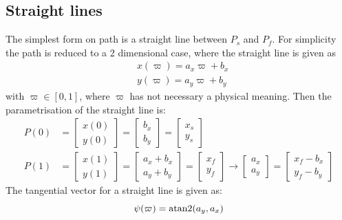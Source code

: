 \subsection{Straight lines}
The simplest form on path is a straight line between $P_s$ and $P_f$. For simplicity the path is reduced to a 2 dimensional case, where the straight line is given as 
\begin{subequations}
\begin{align}
& x(\varpi) = a_x\varpi + b_x \\
& y(\varpi) = a_y\varpi + b_y 
\end{align}
\end{subequations}
with $ \varpi \in [0,1] $, where $\varpi$ has not necessary a physical meaning. Then the parametrisation of the straight line is:
\begin{subequations}
\begin{align}
P(0) &= \begin{bmatrix}
x(0) \\
y(0)
\end{bmatrix} = \begin{bmatrix}
b_x \\
b_y
\end{bmatrix} = \begin{bmatrix}
x_s \\
y_s
\end{bmatrix} \\
P(1) &= \begin{bmatrix}
x(1) \\
y(1)
\end{bmatrix} = \begin{bmatrix}
a_x + b_x \\
a_y + b_y
\end{bmatrix} = \begin{bmatrix}
x_f \\
y_f
\end{bmatrix} \rightarrow \begin{bmatrix}
a_x \\
a_y
\end{bmatrix} = \begin{bmatrix}
x_f - b_x \\
y_f - b_y
\end{bmatrix}
\end{align}
\end{subequations}
The tangential vector for a straight line is given as:
\begin{equation}
\psi(\varpi) = \atan2(a_y,a_x)
\end{equation}
